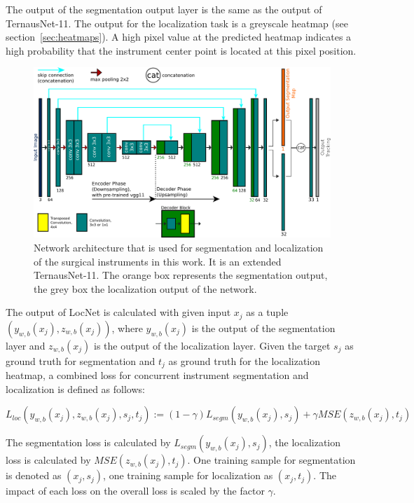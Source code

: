 The output of the segmentation output layer is the same as the output of TernausNet-11.
The output for the localization task is a greyscale heatmap (see section~\ref{sec:heatmaps}).
A high pixel value at the predicted heatmap indicates a high probability that the instrument center point is located at this pixel position.

\begin{figure}
	\centering
	\includegraphics[width=.8\textwidth]{images/networks/TrackingNet_description.png}
	\caption[Structure of Localization Network]{Network architecture that is used for segmentation and localization of the surgical instruments in this work. It is an extended TernausNet-11. The orange box represents the segmentation output, the grey box the localization output of the network.} 
	\label{img:tracking_network_unet11based}
\end{figure}

The output of LocNet is calculated with given input $x_j$ as a tuple $(y_{w,b}(x_j), z_{w,b}(x_j))$, where $y_{w,b}(x_j)$ is the output of the segmentation layer and $z_{w,b}(x_j)$ is the output of the localization layer.
Given the target $s_j$ as ground truth for segmentation and $t_j$ as ground truth for the localization heatmap, a combined loss for concurrent instrument segmentation and localization is defined as follows:

\begin{equation}
\label{eq:track_loss}
L_{loc}(y_{w,b}(x_j), z_{w,b}(x_j), s_j, t_j) := (1-\gamma)L_{segm}(y_{w,b}(x_j), s_j) + \gamma MSE(z_{w,b}(x_j), t_j)
\end{equation}

The segmentation loss is calculated by $L_{segm}(y_{w,b}(x_j), s_j)$, the localization loss is calculated by $MSE(z_{w,b}(x_j), t_j)$. One training sample for segmentation is denoted as $(x_j, s_j)$, one training sample for localization as $(x_j, t_j)$.
The impact of each loss on the overall loss is scaled by the factor $\gamma$.


